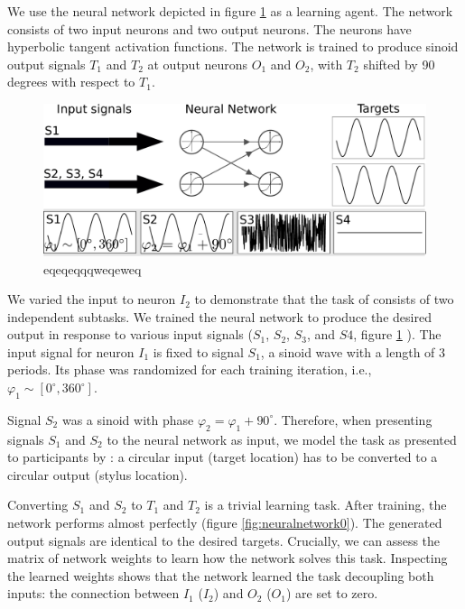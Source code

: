\documentclass[11pt]{article}
\begin{document}
We use the neural network depicted in figure \ref{fig:neuralnetwork} as a learning agent. The network consists of two input neurons and two output neurons. The neurons have hyperbolic tangent activation functions. The network is trained to produce sinoid output signals $T_1$ and $T_2$ at output neurons $O_1$ and $O_2$, with $T_2$ shifted by 90 degrees with respect to $T_1$.

\begin{figure}
	\centering
	\includegraphics[width=1\linewidth]{neural_network}
	\caption{eqeqeqqqweqeweq}
	\label{fig:neuralnetwork}
\end{figure}

We varied the input to neuron $I_2$ to demonstrate that the  task of \citet{Annand2020} consists of two independent subtasks. We trained the neural network to produce the desired output in response to various input signals ($S_1$, $S_2$, $S_3$, and $S4$, figure \ref{fig:neuralnetwork} ). The input signal for neuron $I_1$ is fixed to signal $S_1$, a sinoid wave with a length of 3 periods. Its phase was randomized for each training iteration, i.e., $\varphi_1 \sim [0^\circ, 360^\circ]$.



Signal $S_2$ was a sinoid with phase  $ \varphi_2 = \varphi_1 + 90^\circ$. Therefore, when presenting signals $S_1$ and $S_2$ to the neural network as input, we model the task as presented to participants by \citet{Annand2020}: a circular input (target location) has to be converted to a circular output (stylus location). 

Converting $S_1$ and $S_2$ to $T_1$ and $T_2$ is a trivial learning task. After training, the network performs almost perfectly (figure \ref{fig:neuralnetwork0}). The generated output signals are identical to the desired targets. Crucially, we can assess the matrix of network weights to learn how the network solves this task. Inspecting the learned weights shows that the network learned the task decoupling both inputs: the connection between $I_1$ ($I_2$) and $O_2$ ($O_1$) are set to zero.
\end{document}

